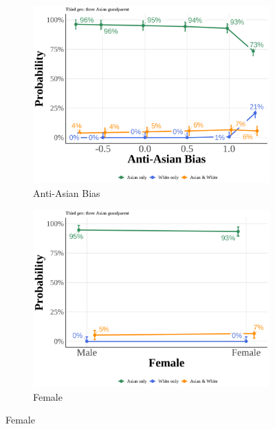 \pagebreak
\newpage

\begin{center}
\begin{figure}[!htb]
\centering
\caption{Predicted Probabilities: Third Generation Three Asian Grandparents}
\label{fig:pp-third-three}

\begin{subfigure}{.48\textwidth}
\caption{Anti-Asian Bias}
\centering
\includegraphics[width=1\linewidth]{simple_pp_value_third_three.png}
\end{subfigure}
\hfill
\begin{subfigure}{.48\textwidth}
\caption{Female}
\centering
\includegraphics[width=1\linewidth]{simple_pp_Female_third_three.png}
\end{subfigure}


\end{figure}
\end{center}

